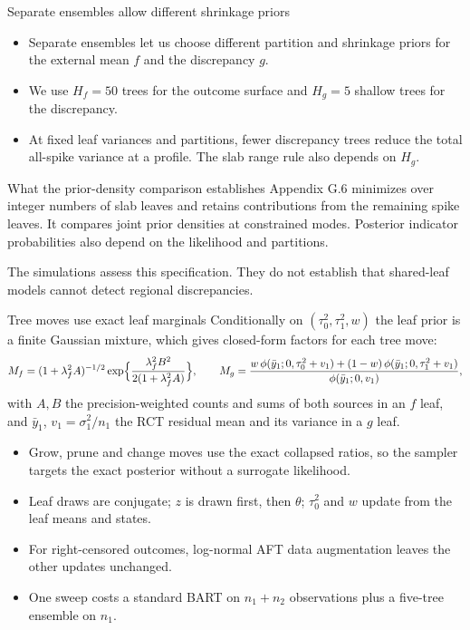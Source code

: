 \documentclass[11pt,aspectratio=169]{beamer}
\begin{document}
\begin{frame}{Separate ensembles allow different shrinkage priors}
  \small
  \begin{itemize}
    \item Separate ensembles let us choose different partition and shrinkage priors for the external mean $f$ and the discrepancy $g$.
    \item We use $H_f=50$ trees for the outcome surface and $H_g=5$ shallow trees for the discrepancy.
    \item At fixed leaf variances and partitions, fewer discrepancy trees reduce the total all-spike variance at a profile. The slab range rule also depends on $H_g$.
  \end{itemize}
  \begin{block}{What the prior-density comparison establishes}
    Appendix G.6 minimizes over integer numbers of slab leaves and retains contributions from the remaining spike leaves. It compares joint prior densities at constrained modes. Posterior indicator probabilities also depend on the likelihood and partitions.
  \end{block}
  \footnotesize The simulations assess this specification. They do not establish that shared-leaf models cannot detect regional discrepancies.
\end{frame}

\begin{frame}{Tree moves use exact leaf marginals}
  \footnotesize
  Conditionally on $(\tau_0^2,\tau_1^2,w)$ the leaf prior is a finite Gaussian mixture, which gives closed-form factors for each tree move:
  \[
    M_f=(1+\lambda_f^2A)^{-1/2}\exp\Bigl\{\frac{\lambda_f^2B^2}{2(1+\lambda_f^2A)}\Bigr\},
    \qquad
    M_g=\frac{w\,\phi(\bar y_1;0,\tau_0^2+v_1)+(1-w)\,\phi(\bar y_1;0,\tau_1^2+v_1)}{\phi(\bar y_1;0,v_1)},
  \]
  with $A,B$ the precision-weighted counts and sums of both sources in an $f$ leaf, and $\bar y_1$, $v_1=\sigma_1^2/n_1$ the RCT residual mean and its variance in a $g$ leaf.
  \begin{itemize}
    \item Grow, prune and change moves use the exact collapsed ratios, so the sampler targets the exact posterior without a surrogate likelihood.
    \item Leaf draws are conjugate; $z$ is drawn first, then $\theta$; $\tau_0^2$ and $w$ update from the leaf means and states.
    \item For right-censored outcomes, log-normal AFT data augmentation leaves the other updates unchanged.
    \item One sweep costs a standard BART on $n_1+n_2$ observations plus a five-tree ensemble on $n_1$.
  \end{itemize}
\end{frame}
\end{document}
